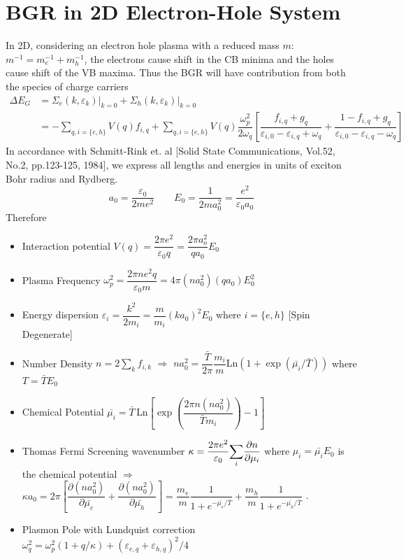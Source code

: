 \documentclass[aps,prb,onecolumn,notitlepage,showpacs,floatfix,superscriptaddress]{revtex4-1}
\begin{document}
\section*{BGR in 2D Electron-Hole System}
In 2D, considering an electron hole plasma with a reduced mass $m$: $m^{-1}=m_e^{-1}+m_h^{-1}$, the electrons cause shift in the CB minima and the holes cause shift of the VB maxima. Thus the BGR will have contribution from both the species of charge carriers
\begin{equation}
\begin{split}
\Delta E_G &= \Sigma_e(k,\varepsilon_k)\vert_{k=0}+\Sigma_h(k,\varepsilon_k)\vert_{k=0} \\
&= -\sum_{q,i=\{e,h\} }V(q) f_{i,q} + \sum_{q,i=\{e,h\} } V(q) \dfrac{\omega_p^2}{2\omega_q} \left[\dfrac{f_{i,q}+g_q}{\varepsilon_{i,0} - \varepsilon_{i,q}+\omega_q}+\dfrac{1-f_{i,q}+g_q}{\varepsilon_{i,0} - \varepsilon_{i,q}-\omega_q} \right]
\end{split}
\end{equation}
In accordance with Schmitt-Rink et. al [Solid State Communications, Vol.52, No.2, pp.123-125, 1984], we express all lengths and energies in units of exciton Bohr radius and Rydberg.
\begin{equation}
a_0 = \dfrac{\varepsilon_0}{2 m e^2} \qquad E_0 = \dfrac{1}{2ma_0^2} = \dfrac{e^2}{\varepsilon_0 a_0}
\end{equation}
Therefore
\begin{itemize}
\item Interaction potential $V(q)=\dfrac{2\pi e^2}{\varepsilon_0 q} = \dfrac{2\pi a_o^2}{qa_0} E_0$
\item Plasma Frequency $\omega_p^2 = \dfrac{2\pi n e^2 q}{\varepsilon_0 m} = 4\pi (na_0^2) (qa_0) E_0^2$
\item Energy dispersion $\varepsilon_i = \dfrac{k^2}{2 m_i} = \dfrac{m}{m_i} (ka_0)^2 E_0$ where $i=\{e,h\}$ [Spin Degenerate]
\item Number Density $n=2\sum_k f_{i,k}$ $\Rightarrow$ $na_0^2 = \dfrac{\bar{T}}{2\pi} \dfrac{m_i}{m} \text{Ln} (1+ \exp(\bar{\mu_i}/\bar{T})) $ where $T=\bar{T} E_0$
\item Chemical Potential $\bar{\mu_i} = \bar{T} \, \text{Ln} \left[\exp\left({\dfrac{2\pi n (na_0^2)}{\bar{T}m_i}}\right)-1 \right]$
\item Thomas Fermi Screening wavenumber $\kappa = \dfrac{2\pi e^2}{\varepsilon_0} \mathlarger{\sum_{i}} \dfrac{\partial n}{\partial \mu_i}$ where $\mu_i = \bar{\mu_i} E_0$ is the chemical potential $\Rightarrow$ $\kappa a_0 = 2\pi \left[\dfrac{\partial (na_0^2)}{\partial \bar{\mu_e}}+\dfrac{\partial (na_0^2)}{\partial \bar{\mu_h}} \right] = \dfrac{m_e}{m}\dfrac{1}{1+e^{-\bar{\mu_e}/\bar{T}}}+\dfrac{m_h}{m}\dfrac{1}{1+e^{-\bar{\mu_h}/\bar{T}}}$ .
\item Plasmon Pole with Lundquist correction $\omega_q^2 = \omega_p^2 (1+q/\kappa) + (\varepsilon_{e,q}+\varepsilon_{h,q})^2/4$
\end{itemize}
\end{document}
